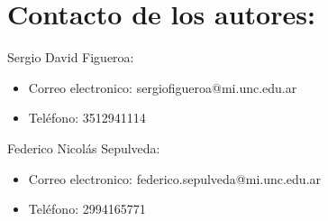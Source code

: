 \chapter*{\Large Contacto de los autores:}
Sergio David Figueroa: 
    \begin{itemize}
        \item Correo electronico: sergiofigueroa@mi.unc.edu.ar
        \item Teléfono: 3512941114 
    \end{itemize}
Federico Nicolás Sepulveda: 
    \begin{itemize}
        \item Correo electronico: federico.sepulveda@mi.unc.edu.ar
        \item Teléfono: 2994165771 
    \end{itemize}

